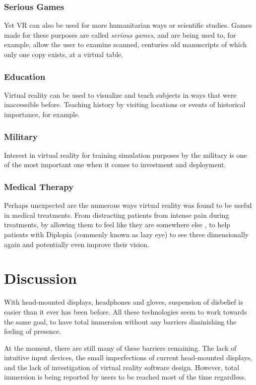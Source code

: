 \documentclass[11pt]{article}
\begin{document}
		\subsubsection{Serious Games}
	Yet VR can also be used for more humanitarian ways or scientific studies. Games made for these purposes are called \emph{serious games}, and are being used to, for example, allow the user to examine scanned, centuries old manuscripts of which only one copy exists, at a virtual table. \cite{lorenzini2013serious}
	
		\subsubsection{Education}
	Virtual reality can be used to visualize and teach subjects in ways that were inaccessible before. Teaching history by visiting locations or events of historical importance, for example. \cite{mosaker2001visualising}
	
		\subsubsection{Military}
	Interest in virtual reality for training simulation purposes by the military is one of the most important one when it comes to investment and deployment. \cite{moshell1993three}
	
		\subsubsection{Medical Therapy}
	Perhaps unexpected are the numerous ways virtual reality was found to be useful in medical treatments. From distracting patients from intense pain during treatments, by allowing them to feel like they are somewhere else \cite{hoffman14}, %
	to help patients with Diplopia (commenly known as lazy eye) to see three dimensionally again and potentially even improve their vision. \cite{blaha2014diplopia}

\section{Discussion}
With head-mounted displays, headphones and gloves, suspension of disbelief is easier than it ever has been before. All these technologies seem to work towards the same goal, to have total immersion without any barriers diminishing the feeling of presence.

At the moment, there are still many of these barriers remaining. The lack of intuitive input devices, the small imperfections of current head-mounted displays, and the lack of investigation of virtual reality software design. However, total immersion is being reported by users to be reached most of the time regardless. \cite{bastiaens14}
\end{document}
